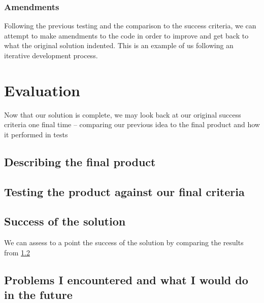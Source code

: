 \documentclass[9pt]{article}
\begin{document}
\subsubsection{Amendments}
Following the previous testing and the comparison to the success criteria, we can attempt to make amendments to the code in order to improve and get back to what the original solution indented. This is an example of us following an iterative development process.
















\newpage
\section{Evaluation}
Now that our solution is complete, we may look back at our original success criteria one final time -- comparing our previous idea to the final product and how it performed in tests


\newpage
\subsection{Describing the final product}


\newpage
\subsection{Testing the product against our final criteria}\label{ssc_testingFinal}




\newpage
\subsection{Success of the solution}
We can assess to a point the success of the solution by comparing the results from \ref{ssc_testingFinal}



\newpage
\subsection{Problems I encountered and what I would do in the future}











\newpage
{}


\newpage
\listoffigures
\end{document}
